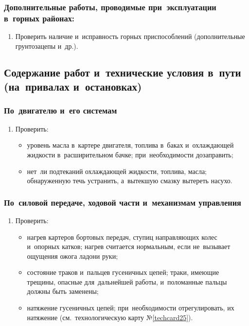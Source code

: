 \subsubsection{Дополнительные работы, проводимые при~эксплуатации в~горных районах:}

\begin{enumerate}
    \item Проверить наличие и~исправность горных приспособлений (дополнительные грунтозацепы и~др.). 
\end{enumerate}



\subsection{Содержание работ и~технические условия в~пути (на~привалах и~остановках)}
\subsubsection{По~двигателю и~его системам}
\begin{enumerate}
    \item Проверить: 
        \begin{itemize}
            \item уровень масла в~картере двигателя, топлива в~баках и~охлаждающей жидкости в~расширительном бачке; при~необходимости дозаправить; 
            \item нет~ли подтеканий охлаждающей жидкости, топлива, масла; обнаруженную течь устранить, а~вытекшую смазку вытереть насухо. 
        \end{itemize}
\end{enumerate}

\subsubsection{По~силовой передаче, ходовой части и~механизмам управления}
\begin{enumerate}
    \item Проверить: 
    \begin{itemize}
        \item нагрев картеров бортовых передач, ступиц направляющих колес и~опорных катков; нагрев считается нормальным, если не~вызывает ощущения ожога ладони руки; 
        \item состояние траков и~пальцев гусеничных цепей; траки, имеющие трещины, опасные для~дальнейшей работы, и~поломанные пальцы должны быть \mbox{заменены}; 
        \item натяжение гусеничных цепей; при~необходимости отрегулировать, их натяжение (см.~технологическую карту №\ref{techcard25}). 
    \end{itemize}
\end{enumerate}


